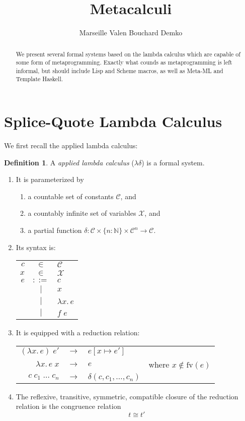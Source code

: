 \documentclass[11pt]{article} %
\title{Metacalculi}
\author{Marseille Valen Bouchard Demko}
\theoremstyle{definition}
\newtheorem{definition}{Definition}
\theoremstyle{remark}
\begin{document}
\maketitle

\begin{abstract}
We present several formal systems based on the lambda calculus which are capable of some form of metaprogramming.
Exactly what counds as metaprogramming is left informal, but should include Lisp and Scheme macros, as well as Meta-ML and Template Haskell.
\end{abstract}

\section{Splice-Quote Lambda Calculus}

We first recall the applied lambda calculus:

\begin{definition}
A \emph{applied lambda calculus} ($\lambda\delta$) is a formal system.
\begin{enumerate}
\item It is parameterized by
  \begin{enumerate}
    \item a countable set of constants $\mathcal{C}$, and
    \item a countably infinite set of variables $\mathcal{X}$, and
    \item a partial function $\delta : \mathcal C \times \{n : \mathbb N\} \times \mathcal C^n \to \mathcal C$.
  \end{enumerate}
\item Its syntax is:
  \begin{center}
  \begin{tabular}{rcl}
  $c$ & $\in$ & $\mathcal C$ \\
  $x$ & $\in$ & $\mathcal X$ \\
  $e$ & $::=$ & $c$ \\
    & $\mid$ & $x$ \\
    & $\mid$ & $\lambda x.\, e$ \\
    & $\mid$ & $f\;e$ \\
  \end{tabular}
  \end{center}
\item It is equipped with a reduction relation:
  \begin{center}
  \begin{tabular}{rcll}
  $(\lambda x.\, e)\;e'$ & $\longrightarrow$ & $e[x \mapsto e']$ \\
  $\lambda x.\, e\;x$ & $\longrightarrow$ & $e$ & where $x \notin \mathrm{fv}(e)$ \\
  $c\;c_1\;\ldots\;c_n$ & $\longrightarrow$ & $\delta(c, c_1, \ldots, c_n)$ \\
  \end{tabular}
  \end{center}
\item
  The reflexive, transitive, symmetric, compatible closure of the reduction relation is the congruence relation
    $$t \cong t'$$
\end{enumerate}
\end{definition}
\end{document}
